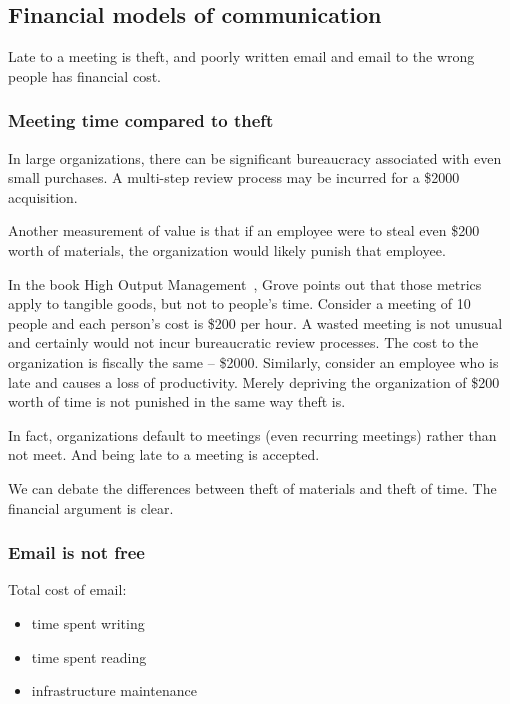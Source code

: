 \subsection*{Financial models of communication}

Late to a meeting is theft, and poorly written email and email to the wrong people has financial cost.

\subsubsection*{Meeting time compared to theft}

In large organizations, there can be significant bureaucracy associated with even small purchases. A multi-step review process may be incurred for a \$2000 acquisition.

Another measurement of value is that if an employee were to steal even \$200 worth of materials, the organization would likely punish that employee.


In the book High Output Management~\cite{1995_Grove}, Grove points out that those metrics apply to tangible goods, but not to people's time. Consider a meeting of 10 people and each person's cost is \$200 per hour. 
A wasted meeting is not unusual and certainly would not incur bureaucratic review processes. The cost to the organization is fiscally the same -- \$2000. Similarly, consider an employee who is late and causes a loss of productivity. Merely depriving the organization of \$200 worth of time is not punished in the same way theft is.

In fact, organizations default to meetings (even recurring meetings) rather than not meet. And being late to a meeting is accepted. 

We can debate the differences between theft of materials and theft of time. The financial argument is clear. 


\subsubsection*{Email is not free}

Total cost of email:
\begin{itemize}
    \item time spent writing
    \item time spent reading
    \item infrastructure maintenance
\end{itemize}

